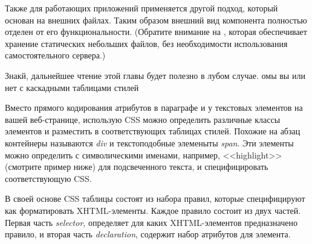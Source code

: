 \documentclass[a4paper,10pt,twoside]{book}
\begin{document}

Также для работающих приложений применяется другой подход,
который основан на внешних файлах.
Таким образом внешний вид компонента полностью отделен
от его функциональности.
(Обратите внимание на , которая обеспечивает
хранение статических небольших файлов,
без необходимости использования самостоятельного сервера.)


Знакй,
дальнейшее чтение этой главы будет полезно в лубом случае.
омы вы или нет с каскадными таблицами стилей

Вместо прямого кодирования атрибутов в параграфе и у текстовых элементов
на вашей веб-странице,
использую CSS можно определить различные классы элементов
и разместить в соответствующих таблицах стилей.
Похожие на абзац контейнеры называются \emph{div}
и текстоподобные элеменыты \emph{span}.
Эти элементы можно определить с символическими именами,
например, <<highlight>> (смотрите пример ниже) для подсвеченного текста,
и специфицировать соответствующую CSS.


В своей основе CSS таблицы состоят из набора правил,
которые специфицируют как форматировать XHTML-элементы.
Каждое правило состоит из двух частей.
Первая часть \emph{selector}, определяет для каких XHTML-элементов
предназначено правило,
и вторая часть \emph{declaration}, содержит набор атрибутов для элемента.
\end{document}
